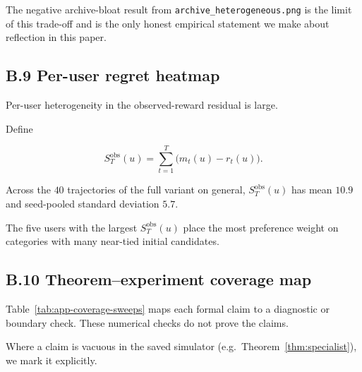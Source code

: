 \documentclass{article} %
\begin{document}
The negative archive-bloat result from \texttt{archive\_heterogeneous.png} is the limit of this trade-off and is the only honest empirical statement we make about reflection in this paper.

\subsection{B.9 Per-user regret heatmap}

\label{app:per-user-regret}

Per-user heterogeneity in the observed-reward residual is large.

Define

\begin{equation}
\label{eq:app-per-user-residual}
S_T^{\mathrm{obs}}(u)
=
\sum_{t=1}^{T}\big(m_t(u)-r_t(u)\big).
\end{equation}

Across the \(40\) trajectories of the full variant on general,
\(S_T^{\mathrm{obs}}(u)\) has mean \(10.9\) and seed-pooled standard deviation
\(5.7\).

The five users with the largest \(S_T^{\mathrm{obs}}(u)\) place the most
preference weight on categories with many near-tied initial candidates.

\subsection{B.10 Theorem--experiment coverage map}

\label{app:coverage-map}

Table~\ref{tab:app-coverage-sweeps} maps each formal claim to a diagnostic or
boundary check. These numerical checks do not prove the claims.

Where a claim is vacuous in the saved simulator (e.g.\ Theorem~\ref{thm:specialist}), we mark it explicitly.
\end{document}
